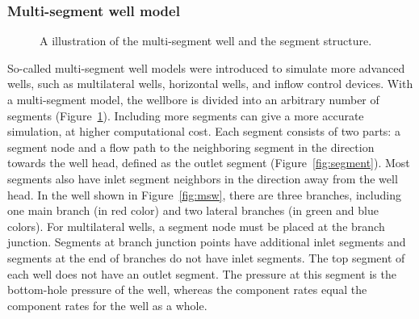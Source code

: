 \subsubsection{Multi-segment well model}

\begin{figure}
\caption{A illustration of the multi-segment well and the segment structure.}
\label{fig:msw_illustration}
\end{figure}


So-called multi-segment well models \cite{holmes1998application} were introduced 
to simulate more advanced wells, such as multilateral wells, horizontal wells, and inflow
control devices. With a multi-segment model, the wellbore is divided
into an arbitrary number of segments (Figure~\ref{fig:msw_illustration}). Including more
segments can give a more accurate simulation, {\revised at higher} computational
cost. Each segment consists of two parts: a segment node and a flow path to the
neighboring segment in the direction towards the well head, defined as the outlet
segment (Figure~\ref{fig:segment}). Most segments also have inlet segment neighbors in the
direction away from the well head. In the well shown in Figure~\ref{fig:msw}, there are
three branches, including one main branch (in red color) and two lateral
branches (in green and blue colors). For multilateral wells, a segment node
must be placed at the branch junction. Segments at branch junction points have additional
inlet segments and segments at the end of branches do not have inlet segments. The top
segment of each well does not have an outlet segment. The pressure at this segment
is the bottom-hole pressure of the well, whereas the component rates equal the component rates
for the well as a whole.


